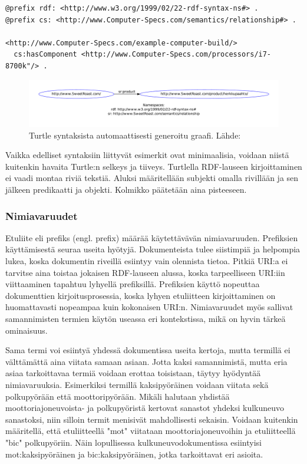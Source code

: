 \documentclass[finnish, 12pt, a4paper, elec, utf8, pdfa, online]{aaltothesis}
\begin{document}
\vskip 0.75cm
\begin{lstlisting}[style=codeblock]
@prefix rdf: <http://www.w3.org/1999/02/22-rdf-syntax-ns#> .
@prefix cs: <http://www.Computer-Specs.com/semantics/relationship#> .

<http://www.Computer-Specs.com/example-computer-build/>
  cs:hasComponent <http://www.Computer-Specs.com/processors/i7-8700k"/> .
\end{lstlisting}
\vskip 0.75cm

\begin{figure}[htb]
\centering
\includegraphics[width=15cm]{images/RDF-triplet2.pdf}
\caption{Turtle syntaksista automaattisesti generoitu graafi. Lähde: \cite{SeCo_RDF_validator} \label{images/RDF-triplet2}}
\end{figure}

Vaikka edelliset syntaksiin liittyvät esimerkit ovat minimaalisia, voidaan niistä kuitenkin havaita Turtle:n selkeys ja tiiveys. Turtlella RDF-lauseen kirjoittaminen ei vaadi montaa riviä tekstiä. Aluksi määritellään subjekti omalla rivillään ja sen jälkeen predikaatti ja objekti. Kolmikko päätetään aina pisteeseen.


\subsubsection{Nimiavaruudet}
Etuliite eli prefiks (engl. prefix) määrää käytettävävän nimiavaruuden. Prefiksien käyttämisestä seuraa useita hyötyjä. Dokumenteista tulee siistimpiä ja helpompia lukea, koska dokumentin riveillä esiintyy vain olennista tietoa. Pitkiä URI:a ei tarvitse aina toistaa jokaisen RDF-lauseen alussa, koska tarpeelliseen URI:iin viittaaminen tapahtuu lyhyellä prefiksillä. Prefiksien käyttö nopeuttaa dokumenttien kirjoitusprosessia, koska lyhyen etuliitteen kirjoittaminen on huomattavasti nopeampaa kuin kokonaisen URI:n. Nimiavaruudet myös sallivat samannimisten termien käytön useassa eri kontekstissa, mikä on hyvin tärkeä ominaisuus.

Sama termi voi esiintyä yhdessä dokumentissa useita kertoja, mutta termillä ei välttämättä aina viitata samaan asiaan. Jotta kaksi samannimistä, mutta eria asiaa tarkoittavaa termiä voidaan erottaa toisistaan, täytyy hyödyntää nimiavaruuksia. Esimerkiksi termillä kaksipyöräinen voidaan viitata sekä polkupyörään että moottoripyörään. Mikäli halutaan yhdistää moottoriajoneuvoista- ja polkupyöristä kertovat sanastot yhdeksi kulkuneuvo sanastoksi, niin silloin termit menisivät mahdollisesti sekaisin. Voidaan kuitenkin määritellä, että etuliitteellä "mot" viitataan moottoriajoneuvoihin ja etuliitteellä "bic" polkupyöriin. Näin lopullisessa kulkuneuvodokumentissa esiintyisi mot:kaksipyöräinen ja bic:kaksipyöräinen, jotka tarkoittavat eri asioita.
\end{document}
